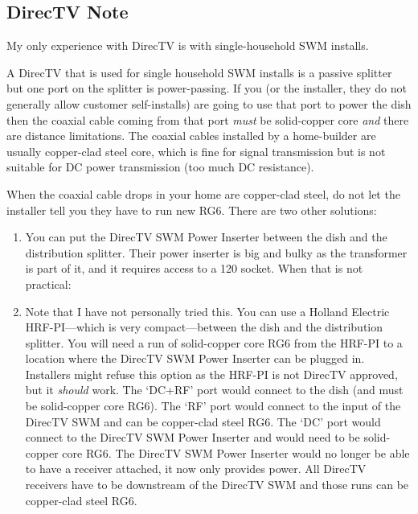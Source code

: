 \subsection{DirecTV Note}

My only experience with DirecTV is with single-household SWM installs.

A DirecTV  that is used for single household SWM installs is a passive
splitter but one port on the splitter is power-passing. If you (or the installer, they do not generally
allow customer self-installs) are going to use that port to power the dish then the coaxial cable coming
from that port \emph{must} be solid-copper core \emph{and} there are distance limitations. The coaxial
cables installed by a home-builder are usually copper-clad steel core, which is fine for signal transmission
but is not suitable for DC power transmission (too much DC resistance).

When the coaxial cable drops in your home are copper-clad steel, do not let the installer tell you they
have to run new RG6. There are two other solutions:

\begin{enumerate}
  \item You can put the DirecTV SWM Power Inserter between the dish and the distribution splitter. Their
        power inserter is big and bulky as the transformer is part of it, and it requires access to a
        \qty{120}{\vrms} socket. When that is not practical:
  \item Note that I have not personally tried this. You can use a Holland Electric HRF-PI---which is
        very compact---between the dish and the distribution splitter. You will need a run of
        solid-copper core RG6 from the HRF-PI to a location where the DirecTV SWM Power Inserter can
        be plugged in. Installers might refuse this option as the HRF-PI is not DirecTV approved, but
        it \emph{should} work. The `DC+RF' port would connect to the dish (and must be solid-copper core
        RG6). The `RF' port would connect to the input of the DirecTV SWM 
        and can be copper-clad steel RG6. The `DC' port would connect to the DirecTV SWM Power Inserter
        and would need to be solid-copper core RG6. The DirecTV SWM Power Inserter would no longer be
        able to have a receiver attached, it now only provides power. All DirecTV receivers have to be
        downstream of the DirecTV SWM  and those runs can be copper-clad
        steel RG6.
\end{enumerate}

